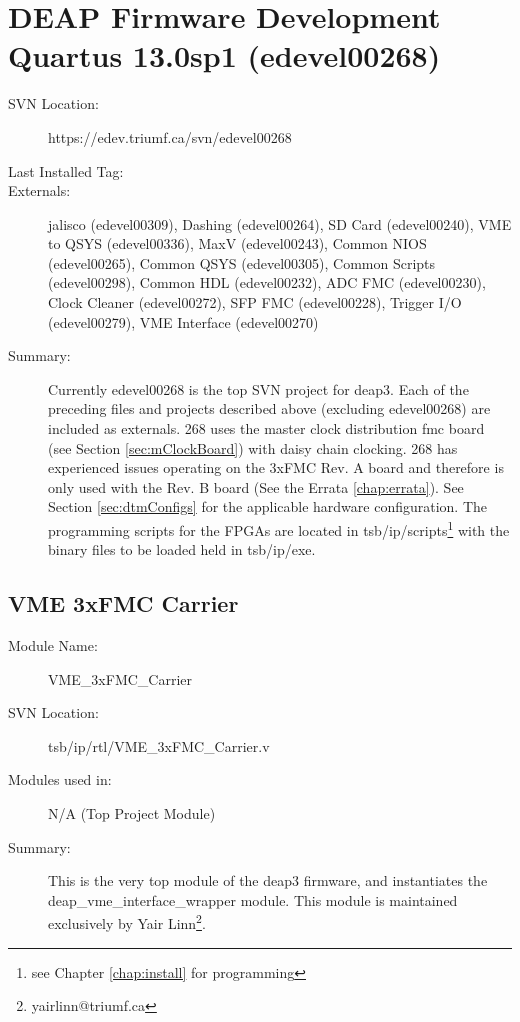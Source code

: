 \section{DEAP Firmware Development Quartus 13.0sp1 (edevel00268)} 
\label{sec:268}
\begin{description}
\item[SVN Location:] https://edev.triumf.ca/svn/edevel00268
\item[Last Installed Tag:] \tagTwoSixEight %
\item[Externals:]  \gls{jalisco} (edevel00309), Dashing (edevel00264), SD Card (edevel00240), VME to QSYS (edevel00336), MaxV (edevel00243), Common NIOS (edevel00265), Common QSYS (edevel00305), Common Scripts (edevel00298), Common HDL (edevel00232), ADC FMC (edevel00230), Clock Cleaner (edevel00272), SFP FMC (edevel00228), Trigger I/O (edevel00279), VME Interface (edevel00270)
\item[Summary: ]Currently edevel00268 is the top SVN project for \gls{deap3}. Each of the preceding files and projects described above (excluding edevel00268) are included as externals. 268 uses the master clock distribution \gls{fmc} board (see Section \ref{sec:mClockBoard}) with daisy chain clocking. 268 has experienced issues operating on the 3xFMC Rev. A board and therefore is only used with the Rev. B board (See the Errata \ref{chap:errata}). See Section \ref{sec:dtmConfigs} for the applicable hardware configuration. The programming scripts for the FPGAs are located in tsb/ip/scripts\footnote{see Chapter \ref{chap:install} for programming} with the binary files to be loaded held in tsb/ip/exe.

\end{description}

	\subsection{VME 3xFMC Carrier} 
	\label{sec:VME_3xFMC_Carrier268}
	\begin{description}
	\item[Module Name:] VME\_3xFMC\_Carrier
	\item[SVN Location:]  tsb/ip/rtl/VME\_3xFMC\_Carrier.v
	\item[Modules used in:] N/A (Top Project Module)
	\item[Summary: ]This is the very top module of the \gls{deap3} firmware, and instantiates the deap\_vme\_interface\_wrapper module. This module is maintained exclusively by Yair Linn\footnote{yairlinn@triumf.ca}.
	\end{description}


